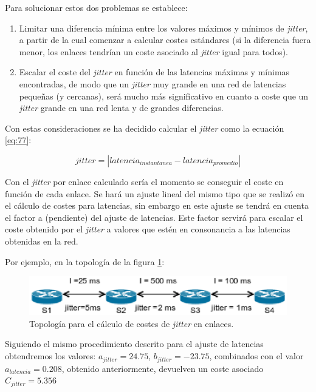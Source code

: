 \documentclass[a4paper,11pt]{book}
\begin{document}
Para solucionar estos dos problemas se establece:

\begin{enumerate}
\item Limitar una diferencia mínima entre los valores máximos y mínimos de \textit{jitter}, a partir de la cual comenzar a calcular costes estándares (si la diferencia fuera menor, los enlaces tendrían un coste asociado al \textit{jitter} igual para todos).
\item Escalar el coste del \textit{jitter} en función de las latencias máximas y mínimas encontradas, de modo que un \textit{jitter} muy grande en una red de latencias pequeñas (y cercanas), será mucho más significativo en cuanto a coste que un \textit{jitter} grande en una red lenta y de grandes diferencias.
\end{enumerate}

Con estas consideraciones se ha decidido calcular el \textit{jitter} como la ecuación \ref{eq:77}:

\begin{equation}\label{eq:77}
jitter = |latencia_{instantanea} - latencia_{promedio}|
\end{equation}


Con el \textit{jitter} por enlace calculado sería el momento se conseguir el coste en función de cada enlace. Se hará un ajuste lineal del mismo tipo que se realizó en el cálculo de costes para latencias, sin embargo en este ajuste se tendrá en cuenta el factor a (pendiente) del ajuste de latencias. Este factor servirá para escalar el coste obtenido por el \textit{jitter} a valores que estén en consonancia a las latencias obtenidas en la red. 

Por ejemplo, en la topología de la figura  \ref{topologyJitter}:

\begin{figure}[tb]
\centering
\includegraphics[scale=0.9]{./figuras/topologyJitter}
\caption{Topología para el cálculo de costes de \emph{jitter} en enlaces.}\label{topologyJitter}
\end{figure}

Siguiendo el mismo procedimiento descrito para el ajuste de latencias obtendremos los valores: $a_{jitter} = 24.75$, $b_{jitter} = -23.75$, combinados con el valor $a_{latencia}=0.208$, obtenido anteriormente, devuelven un coste asociado $C_{jitter}=5.356$  
\end{document}

